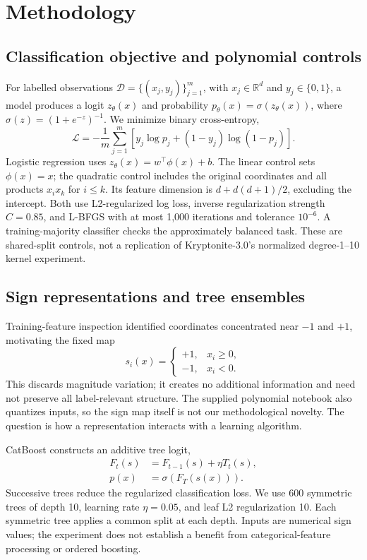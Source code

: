 \documentclass{article}
\begin{document}
\section{Methodology}
\subsection{Classification objective and polynomial controls}
For labelled observations $\mathcal D=\{(x_j,y_j)\}_{j=1}^m$, with $x_j\in\mathbb R^d$ and $y_j\in\{0,1\}$, a model produces a logit $z_\theta(x)$ and probability $p_\theta(x)=\sigma(z_\theta(x))$, where $\sigma(z)=(1+e^{-z})^{-1}$. We minimize binary cross-entropy,
\begin{equation}
\mathcal L=-\frac1m\sum_{j=1}^m\left[y_j\log p_j+(1-y_j)\log(1-p_j)\right].
\label{eq:bce}
\end{equation}
Logistic regression uses $z_\theta(x)=w^\top\phi(x)+b$. The linear control sets $\phi(x)=x$; the quadratic control includes the original coordinates and all products $x_i x_k$ for $i\leq k$. Its feature dimension is $d+d(d+1)/2$, excluding the intercept. Both use L2-regularized log loss, inverse regularization strength $C=0.85$, and L-BFGS with at most 1,000 iterations and tolerance $10^{-6}$. A training-majority classifier checks the approximately balanced task. These are shared-split controls, not a replication of Kryptonite-3.0's normalized degree-1--10 kernel experiment.

\subsection{Sign representations and tree ensembles}
Training-feature inspection identified coordinates concentrated near $-1$ and $+1$, motivating the fixed map
\begin{equation}
s_i(x)=\begin{cases}+1,&x_i\geq0,\\-1,&x_i<0.\end{cases}
\label{eq:sign}
\end{equation}
This discards magnitude variation; it creates no additional information and need not preserve all label-relevant structure. The supplied polynomial notebook also quantizes inputs, so the sign map itself is not our methodological novelty. The question is how a representation interacts with a learning algorithm.

CatBoost \cite{prokhorenkova2018} constructs an additive tree logit,
\begin{align}
F_t(s)&=F_{t-1}(s)+\eta T_t(s),\nonumber\\
p(x)&=\sigma(F_T(s(x))).
\end{align}
Successive trees reduce the regularized classification loss. We use 600 symmetric trees of depth 10, learning rate $\eta=0.05$, and leaf L2 regularization 10. Each symmetric tree applies a common split at each depth. Inputs are numerical sign values; the experiment does not establish a benefit from categorical-feature processing or ordered boosting.
\end{document}
